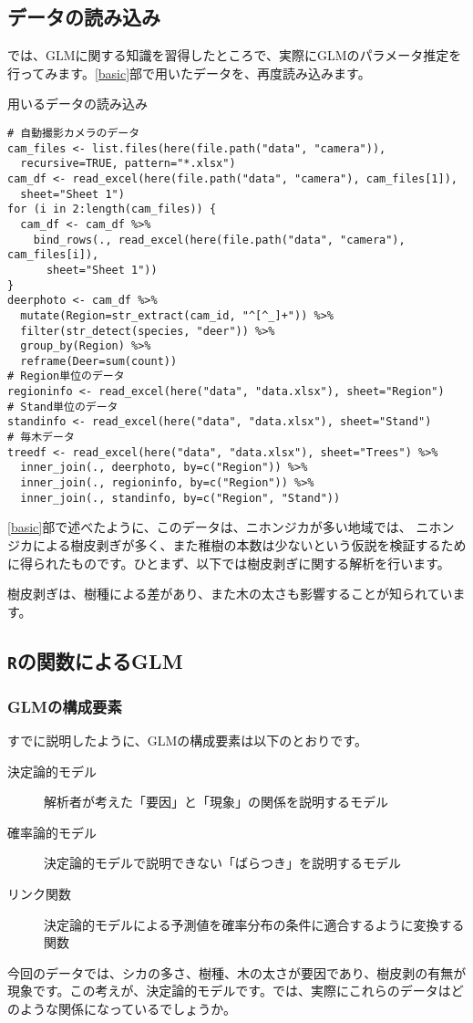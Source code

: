	\subsection{データの読み込み}
では、GLMに関する知識を習得したところで、実際にGLMのパラメータ推定を行ってみます。\ref{basic}部で用いたデータを、再度読み込みます。
\begin{itembox}[l]{用いるデータの読み込み}
\begin{verbatim}
# 自動撮影カメラのデータ
cam_files <- list.files(here(file.path("data", "camera")),
  recursive=TRUE, pattern="*.xlsx") 
cam_df <- read_excel(here(file.path("data", "camera"), cam_files[1]),
  sheet="Sheet 1")
for (i in 2:length(cam_files)) {
  cam_df <- cam_df %>%
    bind_rows(., read_excel(here(file.path("data", "camera"), cam_files[i]),
      sheet="Sheet 1"))
}
deerphoto <- cam_df %>%
  mutate(Region=str_extract(cam_id, "^[^_]+")) %>%
  filter(str_detect(species, "deer")) %>%
  group_by(Region) %>%
  reframe(Deer=sum(count))
# Region単位のデータ
regioninfo <- read_excel(here("data", "data.xlsx"), sheet="Region")
# Stand単位のデータ
standinfo <- read_excel(here("data", "data.xlsx"), sheet="Stand")
# 毎木データ
treedf <- read_excel(here("data", "data.xlsx"), sheet="Trees") %>%
  inner_join(., deerphoto, by=c("Region")) %>%
  inner_join(., regioninfo, by=c("Region")) %>%
  inner_join(., standinfo, by=c("Region", "Stand"))
\end{verbatim}
\end{itembox}
\ref{basic}部で述べたように、このデータは、ニホンジカが多い地域では、
ニホンジカによる樹皮剥ぎが多く、また稚樹の本数は少ないという仮説を検証するために得られたものです。ひとまず、以下では樹皮剥ぎに関する解析を行います。

樹皮剥ぎは、樹種による差があり、また木の太さも影響することが知られています。

	\subsection{\texttt{R}の関数によるGLM}
		\subsubsection{GLMの構成要素}
すでに説明したように、GLMの構成要素は以下のとおりです。
\begin{description}
	\item[決定論的モデル]解析者が考えた「要因」と「現象」の関係を説明するモデル
	\item[確率論的モデル]決定論的モデルで説明できない「ばらつき」を説明するモデル
	\item[リンク関数]決定論的モデルによる予測値を確率分布の条件に適合するように変換する関数
\end{description}
今回のデータでは、シカの多さ、樹種、木の太さが要因であり、樹皮剥の有無が現象です。この考えが、決定論的モデルです。では、実際にこれらのデータはどのような関係になっているでしょうか。

